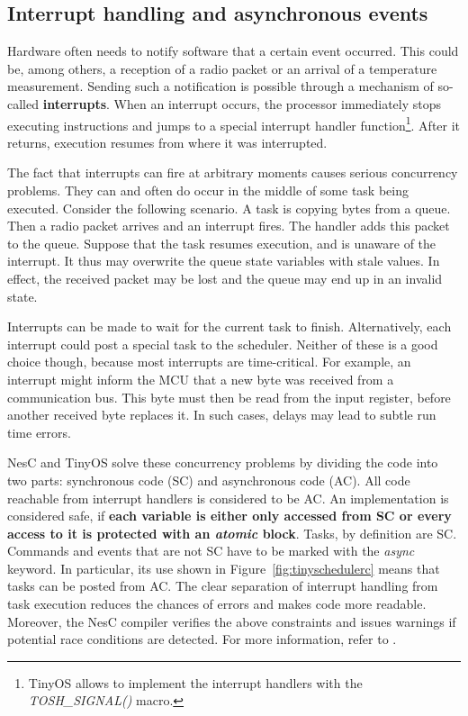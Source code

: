 \subsection{Interrupt handling and asynchronous events}
\label{sec:interrupts_and_async}

Hardware often needs to notify software that a certain event occurred. This could be, among others, a reception of a radio packet or an arrival of a temperature measurement. Sending such a notification is possible through a mechanism of so-called {\bf interrupts}. When an interrupt occurs, the processor immediately stops executing instructions and jumps to a special interrupt handler function\footnote{TinyOS allows to implement the interrupt handlers with the \emph{TOSH\_SIGNAL()} macro.}. After it returns, execution resumes from where it was interrupted.

The fact that interrupts can fire at arbitrary moments causes serious concurrency problems. They can and often do occur in the middle of some task being executed.  Consider the following scenario. A task is copying bytes from a queue. Then a radio packet arrives and an interrupt fires. The handler adds this packet to the queue. Suppose that the task resumes execution, and is unaware of the interrupt. It thus may overwrite the queue state variables with stale values. In effect, the received packet may be lost and the queue may end up in an invalid state.

Interrupts can be made to wait for the current task to finish.  Alternatively, each interrupt could post a special task to the scheduler. Neither of these is a good choice though, because most interrupts are time-critical. For example, an interrupt might inform the MCU that a new byte was received from a communication bus. This byte must then be read from the input register, before another received byte replaces it. In such cases, delays may lead to subtle run time errors.

NesC and TinyOS solve these concurrency problems by dividing the code into two parts: synchronous code (SC) and asynchronous code (AC).  All code reachable from interrupt handlers is considered to be AC. An implementation is considered safe, if {\bf each variable is either only accessed from SC or every access to it is protected with an \emph{atomic} block}. Tasks, by definition are SC. Commands and events that are not SC have to be marked with the \emph{async} keyword. In particular, its use shown in Figure~\ref{fig:tinyschedulerc} means that tasks can be posted from AC. The clear separation of interrupt handling from task execution reduces the chances of errors and makes code more readable. Moreover, the NesC compiler verifies the above constraints and issues warnings if potential race conditions are detected. For more information, refer to \cite[ch. 8]{NesCMan}.

